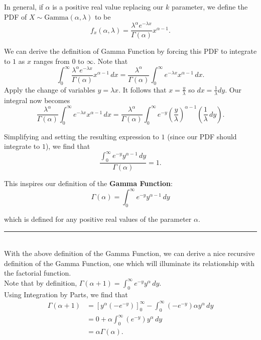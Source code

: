 \begin{enumerate}[a)]
    In general, if $\alpha$ is a positive real value replacing our $k$ parameter, we define the PDF of $X \sim \mathrm{Gamma}(\alpha, \lambda)$ to be
    \[
        f_x(\alpha, \lambda) = \frac{\lambda^\alpha e^{-\lambda x}}{\Gamma(\alpha)} x^{\alpha-1}.
    \] 

    We can derive the definition of Gamma Function by forcing this PDF to integrate to $1$ as $x$ ranges from $0$ to $\infty$. Note that
    \[
        \int_0^{\infty} \frac{\lambda^\alpha e^{-\lambda x}}{\Gamma(\alpha)} x^{\alpha-1} \, dx = \frac{\lambda^\alpha}{\Gamma(\alpha)}\int_0^{\infty} e^{-\lambda x} x^{\alpha-1} \, dx.
    \]
    Apply the change of variables $y = \lambda x$. It follows that $x = \frac{y}{\lambda}$ so $dx = \frac{1}{\lambda} dy$. Our integral now becomes
    \[
        \frac{\lambda^\alpha}{\Gamma(\alpha)}\int_0^{\infty} e^{-\lambda x} x^{\alpha-1} \, dx = \frac{\lambda^\alpha}{\Gamma(\alpha)}\int_0^{\infty} e^{-y} \left( \frac{y}{\lambda} \right) ^{\alpha-1} \left(\frac{1}{\lambda }\, dy\right).
    \]

    Simplifying and setting the resulting expression to $1$ (since our PDF should integrate to $1$), we find that
    \[
        \frac{\int_0^{\infty} e^{-y} y^{\alpha - 1} \, dy}{\Gamma(\alpha)} = 1.
    \]

    This inspires our definition of the \textbf{Gamma Function}: 
    \[
        \boxed{\Gamma(\alpha) = \int_0^{\infty} e^{-y} y^{\alpha - 1} \, dy}
    \]

    which is defined for any positive real values of the parameter $\alpha$.

    \noindent\rule{\textwidth}{1pt} \\

    With the above definition of the Gamma Function, we can derive a nice recursive definition of the Gamma Function, 
    one which will illuminate its relationship with the factorial function. \\

    Note that by definition, $\Gamma(\alpha + 1) = \int_0^{\infty} e^{-y} y^{\alpha} \, dy$. \\

    Using Integration by Parts, we find that
    \begin{align*}
        \Gamma(\alpha + 1) &= \left[ y^\alpha (-e^{-y}) \right]_0^{\infty} - \int_0^{\infty} (-e^{-y}) \alpha y^\alpha \, dy \\
        &= 0 + \alpha \int_0^{\infty} (e^{-y}) y^\alpha \, dy \\
        &= \alpha \Gamma(\alpha).
    \end{align*}


\end{enumerate}
